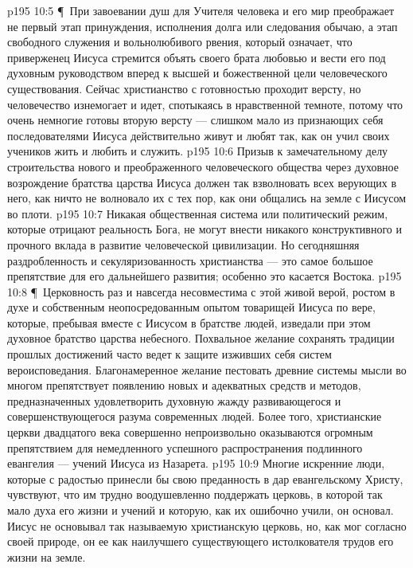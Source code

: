 \vs p195 10:5 \P\ При завоевании душ для Учителя человека и его мир преображает не первый этап принуждения, исполнения долга или следования обычаю, а  этап свободного служения и вольнолюбивого рвения, который означает, что приверженец Иисуса стремится объять своего брата любовью и вести его под духовным руководством вперед к высшей и божественной цели человеческого существования. Сейчас христианство с готовностью проходит  версту, но человечество изнемогает и идет, спотыкаясь в нравственной темноте, потому что очень немногие готовы вторую версту --- слишком мало из признающих себя последователями Иисуса действительно живут и любят так, как он учил своих учеников жить и любить и служить.
\vs p195 10:6 Призыв к замечательному делу строительства нового и преображенного человеческого общества через духовное возрождение братства царства Иисуса должен так взволновать всех верующих в него, как ничто не волновало их с тех пор, как они общались на земле с Иисусом во плоти.
\vs p195 10:7 Никакая общественная система или политический режим, которые отрицают реальность Бога, не могут внести никакого конструктивного и прочного вклада в развитие человеческой цивилизации. Но сегодняшняя раздробленность и секуляризованность христианства --- это самое большое препятствие для его дальнейшего развития; особенно это касается Востока.
\vs p195 10:8 \P\ Церковность раз и навсегда несовместима с этой живой верой, ростом в духе и собственным неопосредованным опытом товарищей Иисуса по вере, которые, пребывая вместе с Иисусом в братстве людей, изведали при этом духовное братство царства небесного. Похвальное желание сохранять традиции прошлых достижений часто ведет к защите изживших себя систем вероисповедания. Благонамеренное желание пестовать древние системы мысли во многом препятствует появлению новых и адекватных средств и методов, предназначенных удовлетворить духовную жажду развивающегося и совершенствующегося разума современных людей. Более того, христианские церкви двадцатого века совершенно непроизвольно оказываются огромным препятствием для немедленного успешного распространения подлинного евангелия --- учений Иисуса из Назарета.
\vs p195 10:9 Многие искренние люди, которые с радостью принесли бы свою преданность в дар евангельскому Христу, чувствуют, что им трудно воодушевленно поддержать церковь, в которой так мало духа его жизни и учений и которую, как их ошибочно учили, он основал. Иисус не основывал так называемую христианскую церковь, но, как мог согласно своей природе, он  ее как наилучшего существующего истолкователя трудов его жизни на земле.
